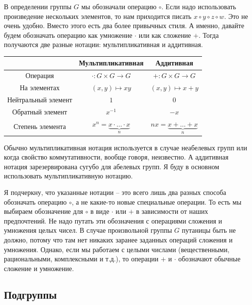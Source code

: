 В определении группы $G$ мы обозначали операцию $\circ$.
Если надо использовать произведение нескольких элементов, то нам приходится писать $x \circ y \circ z \circ w$.
Это не очень удобно.
Вместо этого есть два более привычных стиля.
А именно, давайте будем обозначать операцию как умножение $\cdot$ или как сложение $+$.
Тогда получаются две разные нотации: мультипликативная и аддитивная.
\begin{center}
\begin{tabular}{c|c|c}
{}&{Мультипликативная}&{Аддитивная}\\
\hline
{Операция}&{$\cdot \colon G\times G\to G$}&{$+\colon G\times G\to G$}\\
{На элементах}&{$(x, y)\mapsto xy$}&{$(x,y)\mapsto x+y$}\\
{Нейтральный элемент}&{$1$}&{$0$}\\
{Обратный элемент}&{$x^{-1}$}&{$-x$}\\
{Степень элемента}&{$x^n = \underbrace{x \cdot\ldots \cdot x}_n$}&{$nx = \underbrace{x + \ldots + x}_n$}\\
\end{tabular}
\end{center}
Обычно мультипликативная нотация используется в случае неабелевых групп или когда свойство коммутативности, вообще говоря, неизвестно.
А аддитивная нотация зарезервирована сугубо для абелевых групп.
Я буду в основном использовать мультипликативную нотацию.

Я подчеркну, что указанные нотации -- это всего лишь два разных способа обозначать операцию $\circ$, а не какие-то новые специальные операции.
 То есть мы выбираем обозначение для $\circ$ в виде $\cdot$ или $+$ в зависимости от наших предпочтений.
Не надо путать эти обозначения с операциями сложения и умножения целых чисел.
В случае произвольной группы $G$ путаницы быть не должно, потому что там нет никаких заранее заданных операций сложения и умножения.
Однако, если мы работаем с целыми числами (вещественными, рациональными, комплексными и т.д.), то операции $+$ и $\cdot$ обозначают обычные сложение и умножение.

\subsection{Подгруппы}

